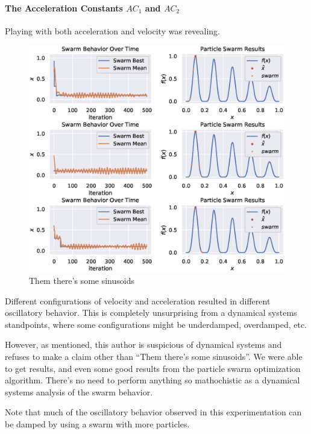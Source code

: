 \documentclass[12pt]{article}
\begin{document}
\paragraph{The Acceleration Constants $AC_1$ and $AC_2$} Playing with both acceleration and velocity was revealing.

\begin{figure}[H]
    \centering
    \includegraphics[width=\textwidth]{figures/pso-sinusoids.eps}
    \caption{Them there's some sinusoids}\label{fig:pso:sinusoids}
\end{figure}

Different configurations of velocity and acceleration resulted in different oscillatory behavior.
This is completely unsurprising from a dynamical systems standpoints, where some configurations might be underdamped, overdamped, etc.

However, as mentioned, this author is suspicious of dynamical systems and refuses to make a claim other than ``Them there's some sinusoids''.
We were able to get results, and even some good results from the particle swarm optimization algorithm.
There's no need to perform anything so mathochistic as a dynamical systems analysis of the swarm behavior.

Note that much of the oscillatory behavior observed in this experimentation can be damped by using a swarm with more particles.
\end{document}
